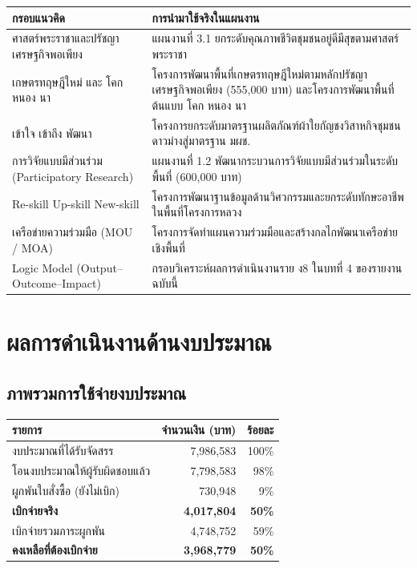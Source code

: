 \documentclass[12pt,a4paper]{article}
\begin{document}
\begin{center}\small
\setlength{\tabcolsep}{6pt}\renewcommand{\arraystretch}{1.3}
\begin{tabular}{p{4.6cm}p{10.4cm}}
\toprule
\rowcolor{rpfnavy!12}
\textbf{กรอบแนวคิด} & \textbf{การนำมาใช้จริงในแผนงาน}\\
\midrule
ศาสตร์พระราชาและปรัชญาเศรษฐกิจพอเพียง & แผนงานที่ 3.1 ยกระดับคุณภาพชีวิตชุมชนอยู่ดีมีสุขตามศาสตร์พระราชา\\
เกษตรทฤษฎีใหม่ และ โคก หนอง นา & โครงการพัฒนาพื้นที่เกษตรทฤษฎีใหม่ตามหลักปรัชญาเศรษฐกิจพอเพียง (555,000 บาท) และโครงการพัฒนาพื้นที่ต้นแบบ โคก หนอง นา\\
เข้าใจ เข้าถึง พัฒนา & โครงการยกระดับมาตรฐานผลิตภัณฑ์ผ้าใยกัญชงวิสาหกิจชุมชนดาวม่างสู่มาตรฐาน มผช.\\
การวิจัยแบบมีส่วนร่วม (Participatory Research) & แผนงานที่ 1.2 พัฒนากระบวนการวิจัยแบบมีส่วนร่วมในระดับพื้นที่ (600,000 บาท)\\
Re-skill Up-skill New-skill & โครงการพัฒนาฐานข้อมูลด้านวิศวกรรมและยกระดับทักษะอาชีพในพื้นที่โครงการหลวง\\
เครือข่ายความร่วมมือ (MOU / MOA) & โครงการจัดทำแผนความร่วมมือและสร้างกลไกพัฒนาเครือข่ายเชิงพื้นที่\\
Logic Model (Output--Outcome--Impact) & กรอบวิเคราะห์ผลการดำเนินงานราย ง8 ในบทที่ 4 ของรายงานฉบับนี้\\
\bottomrule
\end{tabular}
\end{center}

\clearpage
\section{ผลการดำเนินงานด้านงบประมาณ}
\subsection{ภาพรวมการใช้จ่ายงบประมาณ}

\begin{center}\small
\setlength{\tabcolsep}{7pt}\renewcommand{\arraystretch}{1.35}
\begin{tabular}{p{5.4cm}rr}
\toprule
\rowcolor{rpfnavy!12}
\textbf{รายการ} & \textbf{จำนวนเงิน (บาท)} & \textbf{ร้อยละ}\\
\midrule
งบประมาณที่ได้รับจัดสรร & 7,986,583 & 100\%\\
โอนงบประมาณให้ผู้รับผิดชอบแล้ว & 7,798,583 & 98\%\\
ผูกพันใบสั่งซื้อ (ยังไม่เบิก) & 730,948 & 9\%\\
\rowcolor{rpfgreen!10}
\textbf{เบิกจ่ายจริง} & \textbf{4,017,804} & \textbf{50\%}\\
เบิกจ่ายรวมภาระผูกพัน & 4,748,752 & 59\%\\
\rowcolor{rpfamber!12}
\textbf{คงเหลือที่ต้องเบิกจ่าย} & \textbf{3,968,779} & \textbf{50\%}\\
\bottomrule
\end{tabular}
\end{center}
\end{document}

